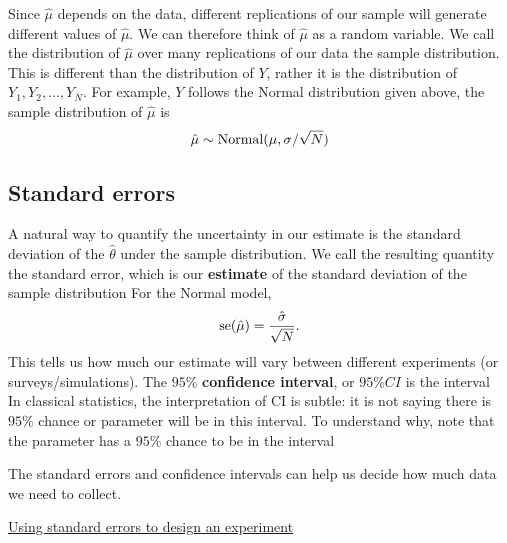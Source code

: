 Since $\hat{\mu}$ depends on the data, different replications of our sample will generate different values of $\hat{\mu}$. We can therefore think of $\hat{\mu}$ as a random variable. We call the distribution of $\hat{\mu}$ over many replications of our data the {\dfn sample distribution}. This is different than the distribution of $Y$, rather it is the distribution of $Y_1,Y_2,\dots,Y_N$.  For example, $Y$ follows the Normal distribution given above, the sample distribution of $\hat{\mu}$ is 
\begin{equation}
\hat{\mu} \sim {\rm Normal}(\mu,\sigma/\sqrt{N})
\end{equation}




\subsection{Standard errors}

A natural way to quantify the uncertainty in our estimate is the standard deviation of the $\hat{\theta}$ under the sample distribution.  We call the resulting quantity the {\dfn standard error}, which is our {\bf estimate} of the standard deviation of the sample distribution 
For the Normal model, 
\begin{equation}
{\rm se}(\hat{\mu}) =  \frac{\hat{\sigma}}{\sqrt{N}}. 
\end{equation}
This tells us how much our estimate will vary between different experiments (or surveys/simulations). The $95\%$ {\bf confidence interval}, or $95\%CI$ is the interval 
\begin{equation}
[\hat{\theta} - 1.96{\rm se}(\hat{\theta}), \hat{\theta} + 1.96{\rm se}(\hat{\theta})]
\end{equation}
In classical statistics, the interpretation of CI is subtle: it is not saying there is $95\%$ chance or parameter will be in this interval. To understand why, note that the parameter has a $95\%$ chance to be in the interval 
\begin{equation}
[\theta - 1.96{\rm std}(\theta),\theta + 1.96{\rm std}(\theta)]
\end{equation}

The standard errors and confidence intervals can help us decide how much data we need to collect. 

\begin{example}
\href{https://colab.research.google.com/drive/1QarJhwPmSqCTQ-HwU_lXCUX6uvdhLdrM#scrollTo=jmB0Mvksc6B_&line=1&uniqifier=1}{Using standard errors to design an experiment}
\end{example}

